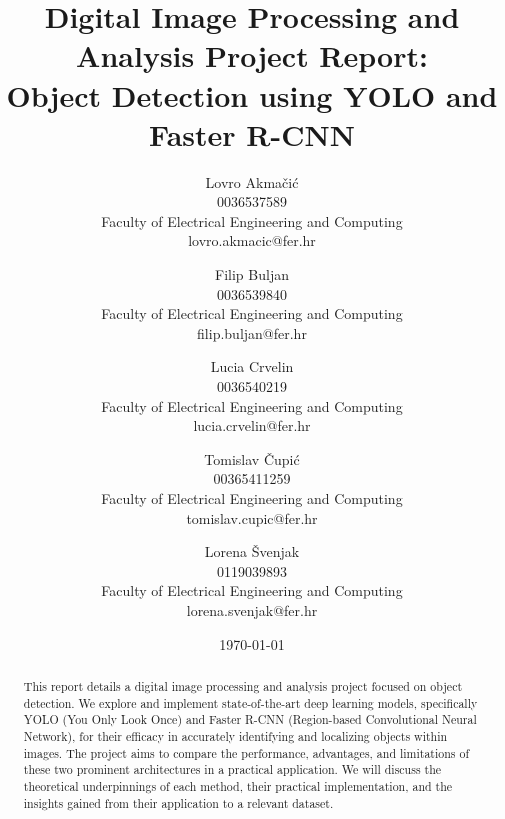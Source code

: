 \documentclass[12pt,a4paper]{article}
\begin{document}
\title{\textbf{Digital Image Processing and Analysis Project Report: \\ [0.5em] Object Detection using YOLO and Faster R-CNN}}
\author{
    Lovro Akmačić \\
    \small 0036537589 \\
    \small Faculty of Electrical Engineering and Computing \\
    \small lovro.akmacic@fer.hr
    \and
    Filip Buljan \\
    \small 0036539840 \\
    \small Faculty of Electrical Engineering and Computing \\
    \small filip.buljan@fer.hr
    \and
    Lucia Crvelin \\
    \small 0036540219 \\
    \small Faculty of Electrical Engineering and Computing \\
    \small lucia.crvelin@fer.hr
    \and
    Tomislav Čupić \\
    \small 00365411259 \\
    \small Faculty of Electrical Engineering and Computing \\
    \small tomislav.cupic@fer.hr
    \and
    Lorena Švenjak \\
    \small 0119039893 \\
    \small Faculty of Electrical Engineering and Computing \\
    \small lorena.svenjak@fer.hr
}
\date{\today} %


\maketitle %

\begin{abstract}
This report details a digital image processing and analysis project focused on object detection. We explore and implement state-of-the-art deep learning models, specifically YOLO (You Only Look Once) and Faster R-CNN (Region-based Convolutional Neural Network), for their efficacy in accurately identifying and localizing objects within images. The project aims to compare the performance, advantages, and limitations of these two prominent architectures in a practical application. We will discuss the theoretical underpinnings of each method, their practical implementation, and the insights gained from their application to a relevant dataset.
\end{abstract}
\end{document}
